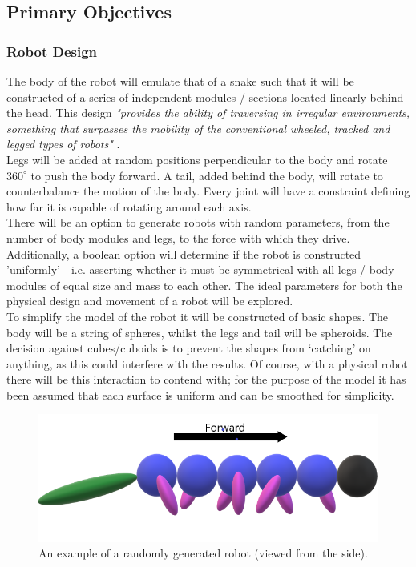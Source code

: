 \documentclass{article}
\begin{document}
\subsection{Primary Objectives}
\label{sec:Primary Objectives}
\subsubsection{Robot Design}
\label{sec:Robot Design}
The body of the robot will emulate that of a snake such that it will be constructed of a series of independent modules / sections located linearly behind the head. This design \textit{"provides the ability of traversing in irregular environments, something that surpasses the mobility of the conventional wheeled, tracked and legged types of robots"} .\\
Legs will be added at random positions perpendicular to the body and rotate $360^\circ$ to push the body forward. A tail, added behind the body, will rotate to counterbalance the motion of the body. Every joint will have a constraint defining how far it is capable of rotating around each axis. \\

There will be an option to generate robots with random parameters, from the number of body modules and legs, to the force with which they drive. Additionally, a boolean option will determine if the robot is constructed 'uniformly' - i.e. asserting whether it must be symmetrical with all legs / body modules of equal size and mass to each other. The ideal parameters for both the physical design and movement of a robot will be explored.\\

To simplify the model of the robot it will be constructed of basic shapes. The body will be a string of spheres, whilst the legs and tail will be spheroids. The decision against cubes/cuboids is to prevent the shapes from ‘catching’ on anything, as this could interfere with the results. Of course, with a physical robot there will be this interaction to contend with; for the purpose of the model it has been assumed that each surface is uniform and can be smoothed for simplicity. \\

\begin{figure}[H]
\centering
\includegraphics[scale=0.5]{robotDesign}
\caption{An example of a randomly generated robot (viewed from the side).}
\end{figure}
\end{document}
